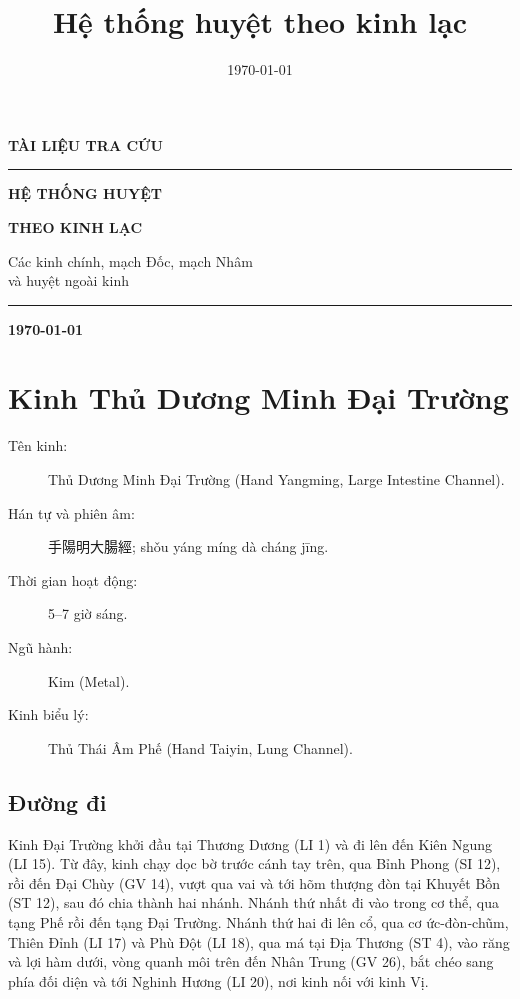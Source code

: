 \documentclass[12pt,a4paper]{article}
\title{Hệ thống huyệt theo kinh lạc}
\date{\today}
\begin{document}
\begin{titlepage}
\thispagestyle{empty}
\centering
\vspace*{1.2cm}
\begin{flushleft}
{\small\bfseries\color{blue!55!black} TÀI LIỆU TRA CỨU\par}
\vspace{0.25cm}
{\color{blue!55!black}\rule{\textwidth}{1.4pt}\par}
\end{flushleft}

\vspace{1.1cm}
\vspace{1.2cm}
{\Huge\bfseries\color{blue!55!black} HỆ THỐNG HUYỆT\par}
\vspace{0.2cm}
{\Huge\bfseries THEO KINH LẠC\par}
\vspace{0.65cm}
{\large\color{black!70} Các kinh chính, mạch Đốc, mạch Nhâm\\
và huyệt ngoài kinh\par}

\vfill
{\color{teal!70!black}\rule{0.28\textwidth}{1pt}\par}
\vspace{0.4cm}
{\large\bfseries\color{blue!55!black}\today\par}
\vspace*{1.2cm}
\end{titlepage}
\clearpage
\tableofcontents
\clearpage

\clearpage
\section{Kinh Thủ Dương Minh Đại Trường}
\begin{description}
  \item[Tên kinh:] Thủ Dương Minh Đại Trường (Hand Yangming, Large Intestine Channel).
  \item[Hán tự và phiên âm:] 手陽明大腸經; shǒu yáng míng dà cháng jīng.
  \item[Thời gian hoạt động:] 5--7 giờ sáng.
  \item[Ngũ hành:] Kim (Metal).
  \item[Kinh biểu lý:] Thủ Thái Âm Phế (Hand Taiyin, Lung Channel).
\end{description}

\subsection*{Đường đi}
Kinh Đại Trường khởi đầu tại Thương Dương (LI 1) và đi lên đến Kiên Ngung (LI 15). Từ đây, kinh chạy dọc bờ trước cánh tay trên, qua Bỉnh Phong (SI 12), rồi đến Đại Chùy (GV 14), vượt qua vai và tới hõm thượng đòn tại Khuyết Bồn (ST 12), sau đó chia thành hai nhánh. Nhánh thứ nhất đi vào trong cơ thể, qua tạng Phế rồi đến tạng Đại Trường. Nhánh thứ hai đi lên cổ, qua cơ ức-đòn-chũm, Thiên Đỉnh (LI 17) và Phù Đột (LI 18), qua má tại Địa Thương (ST 4), vào răng và lợi hàm dưới, vòng quanh môi trên đến Nhân Trung (GV 26), bắt chéo sang phía đối diện và tới Nghinh Hương (LI 20), nơi kinh nối với kinh Vị.
\end{document}
